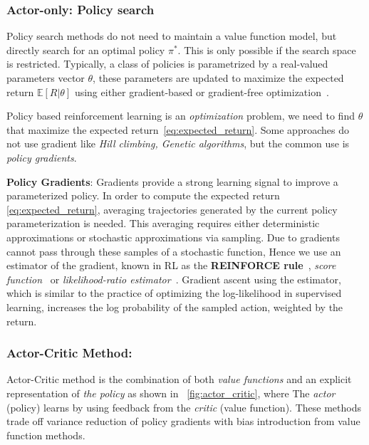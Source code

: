 \subsubsection{Actor-only: Policy search}
Policy search methods do not need to maintain a value function model, but directly search for an optimal policy $\pi^{*}$. This is only possible if the search space is restricted. Typically, a class of policies is parametrized by a real-valued parameters vector $\theta$, these parameters are updated to maximize the expected return $\mathbb{E}[R | \theta]$ using either gradient-based or gradient-free optimization~\parencite{deisenroth2013survey}.

Policy based reinforcement learning is an \textit{optimization} problem, we need to find $\theta$ that maximize the expected return~\eqref{eq:expected_return}.
Some approaches do not use gradient like \textit{Hill climbing, Genetic algorithms}, but the common use is \textit{policy gradients}.


\textbf{Policy Gradients}: Gradients provide a strong learning signal to improve a parameterized policy. In order to compute the expected return \eqref{eq:expected_return}, averaging trajectories generated by the current policy parameterization is needed. This averaging requires either deterministic approximations or stochastic approximations via sampling.
Due to gradients cannot pass through these samples of a stochastic function, 
Hence we use an estimator of the gradient, known in RL as the \textbf{REINFORCE rule}~\parencite{williams1992simple}, \textit{score function}~\parencite{fu2006gradient} or \textit{likelihood-ratio estimator}~\parencite{glynn1990likelihood}.
Gradient ascent using the estimator, which is similar to the practice of optimizing the log-likelihood in supervised learning, increases the log probability of the sampled action, weighted by the return.

\subsubsection{Actor-Critic Method:}
Actor-Critic method is the combination of both \textit{value functions} and an explicit representation of \textit{the policy} as shown in ~\ref{fig:actor_critic}, where The \textit{actor} (policy) learns by using feedback from the \textit{critic} (value function).
These methods trade off variance reduction of policy gradients with bias introduction from value function methods.

